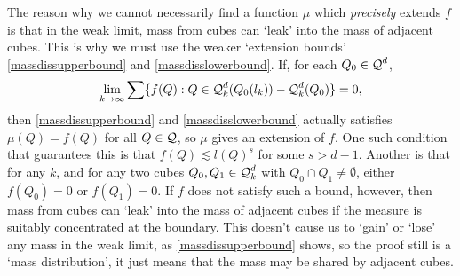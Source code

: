 \begin{remark}
	The reason why we cannot necessarily find a function $\mu$ which \emph{precisely} extends $f$ is that in the weak limit, mass from cubes can `leak' into the mass of adjacent cubes. This is why we must use the weaker `extension bounds' \eqref{massdissupperbound} and \eqref{massdisslowerbound}. If, for each $Q_0 \in \operatorname{\mathcal{Q}}^d$,
	\[ \lim_{k \to \infty} \sum \{ f(Q) : Q \in \operatorname{\mathcal{Q}}^d_k(Q_0(l_k)) - \operatorname{\mathcal{Q}}^d_k(Q_0) \} = 0, \]
	then \eqref{massdissupperbound} and \eqref{massdisslowerbound} actually satisfies $\mu(Q) = f(Q)$ for all $Q \in \operatorname{\mathcal{Q}}$, so $\mu$ gives an extension of $f$. One such condition that guarantees this is that $f(Q) \lesssim l(Q)^s$ for some $s > d-1$. Another is that for any $k$, and for any two cubes $Q_0, Q_1 \in \operatorname{\mathcal{Q}}_k^d$ with $Q_0 \cap Q_1 \neq \emptyset$, either $f(Q_0) = 0$ or $f(Q_1) = 0$. If $f$ does not satisfy such a bound, however, then mass from cubes can `leak' into the mass of adjacent cubes if the measure is suitably concentrated at the boundary. This doesn't cause us to `gain' or `lose' any mass in the weak limit, as \eqref{massdissupperbound} shows, so the proof still is a `mass distribution', it just means that the mass may be shared by adjacent cubes.
\end{remark}


